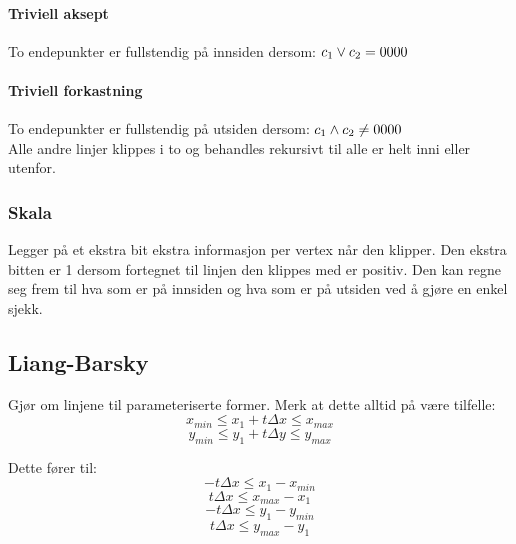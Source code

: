 \paragraph{Triviell aksept}
To endepunkter er fullstendig på innsiden dersom: 
\begin{math} c\textsubscript{1} \vee c\textsubscript{2} = 0000 \end{math}

\paragraph{Triviell forkastning}
To endepunkter er fullstendig på utsiden dersom:
\begin{math} c\textsubscript{1} \wedge c\textsubscript{2} \neq 0000 \end{math} \\

Alle andre linjer klippes i to og behandles rekursivt til alle er helt inni eller utenfor.

\subsubsection{Skala}
Legger på et ekstra bit ekstra informasjon per vertex når den klipper. Den ekstra bitten er 1 dersom fortegnet til linjen den klippes med er positiv. Den kan regne seg frem til hva som er på innsiden og hva som er på utsiden ved å gjøre en enkel sjekk.

\subsection{Liang-Barsky}
Gjør om linjene til parameteriserte former. Merk at dette alltid på være tilfelle:
\begin{equation}
x_{min} \le x_1 + t\Delta x \le x_{max}
\end{equation}
\begin{equation}
y_{min} \le y_1 + t\Delta y \le y_{max}
\end{equation}

Dette fører til:
\begin{equation}
-t\Delta x \le x_1 - x_{min}
\end{equation}
\begin{equation}
t\Delta x \le x_{max} - x_1
\end{equation}
\begin{equation}
-t\Delta x \le y_1 - y_{min}
\end{equation}
\begin{equation}
t\Delta x \le y_{max} - y_1
\end{equation}

